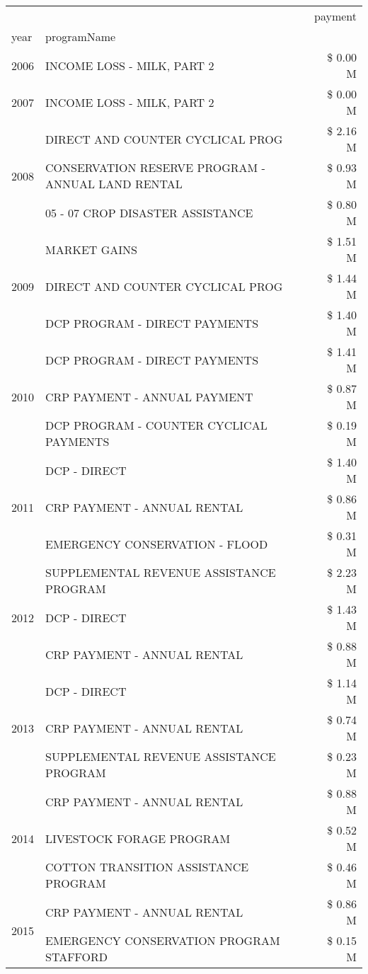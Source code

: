 \begin{tabular}{llr}
\toprule
 &  & payment \\
year & programName &  \\
\midrule
2006 & INCOME LOSS - MILK, PART 2 & \$ 0.00 M \\
\cline{1-3}
2007 & INCOME LOSS - MILK, PART 2 & \$ 0.00 M \\
\cline{1-3}
\multirow[t]{3}{*}{2008} & DIRECT AND COUNTER CYCLICAL PROG & \$ 2.16 M \\
 & CONSERVATION RESERVE PROGRAM - ANNUAL LAND RENTAL & \$ 0.93 M \\
 & 05 - 07 CROP DISASTER ASSISTANCE & \$ 0.80 M \\
\cline{1-3}
\multirow[t]{3}{*}{2009} & MARKET GAINS & \$ 1.51 M \\
 & DIRECT AND COUNTER CYCLICAL PROG & \$ 1.44 M \\
 & DCP PROGRAM - DIRECT PAYMENTS & \$ 1.40 M \\
\cline{1-3}
\multirow[t]{3}{*}{2010} & DCP PROGRAM - DIRECT PAYMENTS & \$ 1.41 M \\
 & CRP PAYMENT - ANNUAL PAYMENT & \$ 0.87 M \\
 & DCP PROGRAM - COUNTER CYCLICAL PAYMENTS & \$ 0.19 M \\
\cline{1-3}
\multirow[t]{3}{*}{2011} & DCP - DIRECT & \$ 1.40 M \\
 & CRP PAYMENT - ANNUAL RENTAL & \$ 0.86 M \\
 & EMERGENCY CONSERVATION - FLOOD & \$ 0.31 M \\
\cline{1-3}
\multirow[t]{3}{*}{2012} & SUPPLEMENTAL REVENUE ASSISTANCE PROGRAM & \$ 2.23 M \\
 & DCP - DIRECT & \$ 1.43 M \\
 & CRP PAYMENT - ANNUAL RENTAL & \$ 0.88 M \\
\cline{1-3}
\multirow[t]{3}{*}{2013} & DCP - DIRECT & \$ 1.14 M \\
 & CRP PAYMENT - ANNUAL RENTAL & \$ 0.74 M \\
 & SUPPLEMENTAL REVENUE ASSISTANCE PROGRAM & \$ 0.23 M \\
\cline{1-3}
\multirow[t]{3}{*}{2014} & CRP PAYMENT - ANNUAL RENTAL & \$ 0.88 M \\
 & LIVESTOCK FORAGE PROGRAM & \$ 0.52 M \\
 & COTTON TRANSITION ASSISTANCE PROGRAM & \$ 0.46 M \\
\cline{1-3}
\multirow[t]{3}{*}{2015} & CRP PAYMENT - ANNUAL RENTAL & \$ 0.86 M \\
 & EMERGENCY CONSERVATION PROGRAM STAFFORD & \$ 0.15 M \\

\end{tabular}
